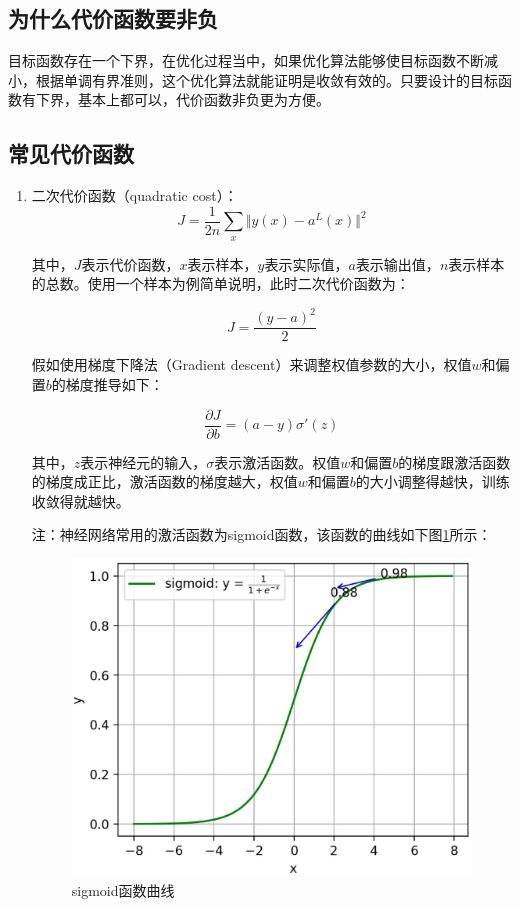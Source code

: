 \subsection{ 为什么代价函数要非负}

目标函数存在一个下界，在优化过程当中，如果优化算法能够使目标函数不断减小，根据单调有界准则，这个优化算法就能证明是收敛有效的。只要设计的目标函数有下界，基本上都可以，代价函数非负更为方便。

\subsection{常见代价函数}

\begin{enumerate}
			\itemsep0em
	\item 二次代价函数（quadratic cost）：
$$
J = \frac{1}{2n}\sum_x\Vert y(x)-a^L(x)\Vert^2
$$

其中，$J$表示代价函数，$x$表示样本，$y$表示实际值，$a$表示输出值，$n$表示样本的总数。使用一个样本为例简单说明，此时二次代价函数为：

$$
J = \frac{(y-a)^2}{2}
$$

假如使用梯度下降法（Gradient descent）来调整权值参数的大小，权值$w$和偏置$b$的梯度推导如下：

$$
\frac{\partial J}{\partial b}=(a-y)\sigma'(z)
$$

其中，$z$表示神经元的输入，$\sigma$表示激活函数。权值$w$和偏置$b$的梯度跟激活函数的梯度成正比，激活函数的梯度越大，权值$w$和偏置$b$的大小调整得越快，训练收敛得就越快。

		注：神经网络常用的激活函数为sigmoid函数，该函数的曲线如下图\ref{fig:2.8}所示：

 \begin{figure}[h]
   \centering
   \includegraphics[width=.7\textwidth]{imgs/2.18.1.eps}
   \caption{sigmoid函数曲线}
   \label{fig:2.8}
 \end{figure}


\end{enumerate}
